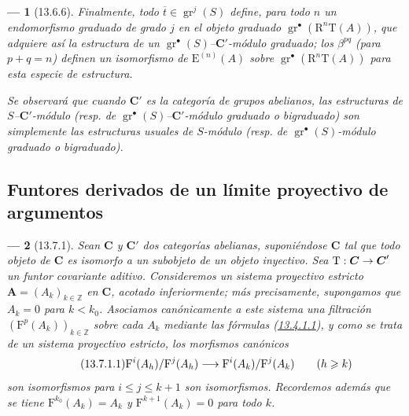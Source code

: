 \documentclass[10pt,oneside,openany]{book}
\theoremstyle{egaenv}\newtheorem*{env}{---}
\theoremstyle{egastatement}
\theoremstyle{egadescription}
\renewcommand{\leq}{\leqslant}
\renewcommand{\geq}{\geqslant}
\renewcommand{\to}{\mathchoice{\longrightarrow}{\rightarrow}{\rightarrow}{\rightarrow}}
\begin{document}
\begin{env}[13.6.6]
Finalmente, todo $\overline t\in\operatorname{gr}^j(S)$ define, para todo
$n$ un endomorfismo graduado de grado $j$ en el objeto graduado $\operatorname{gr}^\bullet(\mathrm R^n\mathrm T(A))$, que adquiere así la
estructura de un
$\operatorname{gr}^\bullet(S)$--\emph{$\boldsymbol{C}'$-módulo graduado}; los $\beta^{pq}$ (para $p+q=n$) definen un \emph{isomorfismo} de
$\mathrm E^{(n)}(A)$ sobre
$\operatorname{gr}^\bullet(\mathrm R^n\mathrm T(A))$ para esta especie
de estructura.

Se observará que cuando $\boldsymbol{C}'$ es la categoría de \emph{grupos abelianos}, las
estructuras de $S$--$\boldsymbol{C}'$-módulo (resp. de
$\operatorname{gr}^\bullet(S)$--$\boldsymbol{C}'$-módulo graduado o bigraduado) son
simplemente las estructuras usuales de $S$-\emph{módulo} (resp. de
$\operatorname{gr}^\bullet(S)$-módulo graduado o bigraduado).
\end{env}

\subsection{Funtores derivados de un límite proyectivo de argumentos}
\label{subsection:0.13.7}
\label{subsection:0.13.7-fr}
\label{0.13.7}

\begin{env}[13.7.1]
\label{0.13.7.1}
\label{0.13.7.1-fr}
Sean $\boldsymbol{C}$ y $\boldsymbol{C}'$ dos categorías abelianas, suponiéndose $\boldsymbol{C}$ tal que todo objeto de $\boldsymbol{C}$ es isomorfo a un subobjeto de un
objeto inyectivo.
Sea
$\mathrm T:\boldsymbol{C}\to \boldsymbol{C}'$
un funtor covariante aditivo.
Consideremos un \emph{sistema proyectivo estricto}
$\mathbf A=(A_k)_{k\in\mathbb Z}$ en $\boldsymbol{C}$, acotado inferiormente; más
precisamente, supongamos que $A_k=0$ para $k<k_0$. Asociamos canónicamente a este sistema una filtración $(\mathrm F^p(A_k))_{k\in\mathbb Z}$ sobre cada $A_k$ mediante las fórmulas (\hyperref[0.13.4.1.1-fr]{13.4.1.1}), y como se trata de un sistema proyectivo \emph{estricto}, los morfismos canónicos
\begin{equation}
\label{0.13.7.1.1-fr}
\tag{13.7.1.1}
\mathrm F^i(A_h)/\mathrm F^j(A_h)\to
\mathrm F^i(A_k)/\mathrm F^j(A_k)\qquad(h\geq k)
\end{equation}
son \emph{isomorfismos} para $i\leq j\leq k+1$ son \emph{isomorfismos}. Recordemos además que se tiene $\mathrm F^{k_0}(A_k)=A_k$ y
$\mathrm F^{k+1}(A_k)=0$ para todo $k$.
\end{env}
\end{document}
